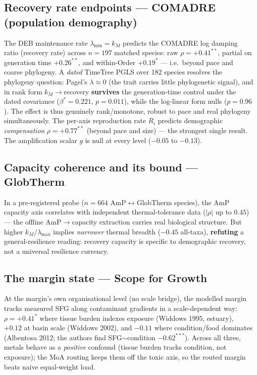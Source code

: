 \subsection{Recovery rate endpoints --- COMADRE (population demography)}
The DEB maintenance rate $\lambda_{\min}=k_M$ predicts the COMADRE log damping ratio (recovery rate)
across $n{=}197$ matched species: raw $\rho={+}0.41^{**}$, partial on generation time $+0.26^{**}$, and
within-Order $+0.19^{*}$ --- i.e.\ beyond pace and coarse phylogeny. A \emph{dated} TimeTree
\citep{timetree} PGLS over 182 species resolves the phylogeny question: Pagel's $\lambda\approx0$ (the
trait carries little phylogenetic signal), and in rank form $k_M\to$recovery \textbf{survives} the
generation-time control under the dated covariance ($\beta^{*}{=}0.221$, $p{=}0.011$), while the
log-linear form nulls ($p{=}0.96$). The effect is thus genuinely rank/monotone, robust to pace and real
phylogeny simultaneously. The per-axis reproduction rate $R_i$ predicts demographic
\emph{compensation} $\rho={+}0.77^{**}$ (beyond pace and size) --- the strongest single result. The
amplification scalar $g$ is null at every level ($-0.05$ to $-0.13$).

\subsection{Capacity coherence and its bound --- GlobTherm}
In a pre-registered probe ($n{=}664$ AmP$\leftrightarrow$GlobTherm species), the AmP capacity axis
correlates with independent thermal-tolerance data ($|\rho|$ up to $0.45$) --- the offline
AmP$\to$capacity extraction carries real biological structure. But higher $k_M/\lambda_{\max}$ implies
\emph{narrower} thermal breadth ($-0.45$ all-taxa), \textbf{refuting} a general-resilience reading:
recovery capacity is specific to demographic recovery, not a universal resilience currency.

\subsection{The margin state --- Scope for Growth}
At the margin's own organisational level (no scale bridge), the modelled margin tracks measured SFG
along contaminant gradients in a scale-dependent way: $\rho={+}0.41^{*}$ where tissue burden indexes
exposure (Widdows 1995, estuary), ${+}0.12$ at basin scale (Widdows 2002), and ${-}0.11$ where
condition/food dominates (Albentosa 2012; the authors find SFG$\sim$condition $-0.62^{***}$). Across all
three, metals behave as a \emph{positive} confound (tissue burden tracks condition, not exposure); the
MoA routing keeps them off the toxic axis, so the routed margin beats naive equal-weight load.

